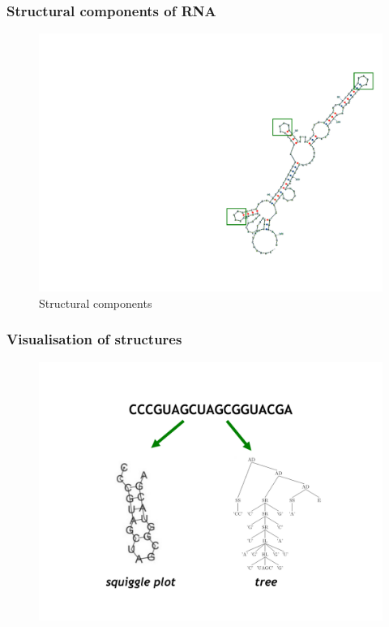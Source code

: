 \documentclass[ignorenonframetext,10pt]{beamer}
\begin{document}
\begin{frame}
\frametitle{Structural components of RNA}  
\begin{figure}
  \includegraphics[scale=0.4]{images/structural_components.pdf} 
  \caption{Structural components}
\end{figure}
\end{frame}



\begin{frame}
\frametitle{Visualisation of structures}  
\begin{figure}
  \includegraphics[scale=0.4]{images/visualisation_structures.pdf} 
\end{figure}
\end{frame}
\end{document}
